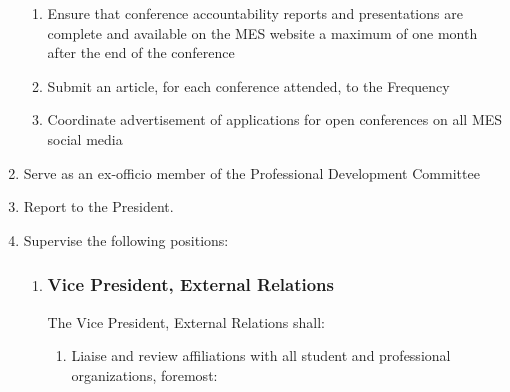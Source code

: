 \begin{enumerate}
  \begin{enumerate}
   \item
    Ensure that conference accountability reports and presentations are
    complete and available on the MES website a maximum of one month
    after the end of the conference
   \item
    Submit an article, for each conference attended, to the Frequency
   \item
    Coordinate advertisement of applications for open conferences on all
    MES social media
  \end{enumerate}
 \item
  Serve as an ex-officio member of the Professional Development
  Committee
 \item
  Report to the President.
 \item
  Supervise the following positions:

  \begin{enumerate}
   \item\hypertarget{vice-president-external-relations}{%
   \subsubsection{Vice President, External
    Relations}
   \label{vice-president-external-relations}}
  The Vice President, External Relations shall:
  
  \begin{enumerate}
   \item
    Liaise and review affiliations with all student and professional
    organizations, foremost:
  

\end{enumerate}
\end{enumerate}
\end{enumerate}
